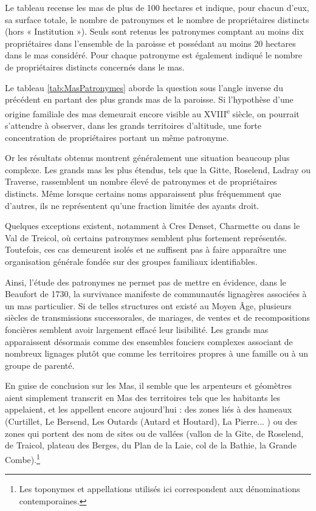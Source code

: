 \documentclass[12pt,a4paper]{report}
\begin{document}
Le tableau recense les mas de plus de 100 hectares et indique, pour chacun d'eux, sa surface totale, le nombre de patronymes et le nombre de propriétaires distincts (hors « Institution »). Seuls sont retenus les patronymes comptant au moins dix propriétaires dans l'ensemble de la paroisse et possédant au moins 20 hectares dans le mas considéré. Pour chaque patronyme est également indiqué le nombre de propriétaires distincts concernés dans le mas.

Le tableau \ref{tab:MasPatronymes} aborde la question sous l'angle inverse du précédent en partant des plus grands mas de la paroisse. Si l'hypothèse d'une origine familiale des mas demeurait encore visible au XVIII\textsuperscript{e} siècle, on pourrait s'attendre à observer, dans les grands territoires d'altitude, une forte concentration de propriétaires portant un même patronyme.

Or les résultats obtenus montrent généralement une situation beaucoup plus complexe. Les grands mas les plus étendus, tels que la Gitte, Roselend, Ladray ou Traverse, rassemblent un nombre élevé de patronymes et de propriétaires distincts. Même lorsque certains noms apparaissent plus fréquemment que d'autres, ils ne représentent qu'une fraction limitée des ayants droit.

Quelques exceptions existent, notamment à Cres Denset, Charmette ou dans le Val de Treicol, où certains patronymes semblent plus fortement représentés. Toutefois, ces cas demeurent isolés et ne suffisent pas à faire apparaître une organisation générale fondée sur des groupes familiaux identifiables.

Ainsi, l'étude des patronymes ne permet pas de mettre en évidence, dans le Beaufort de 1730, la survivance manifeste de communautés lignagères associées à un mas particulier. Si de telles structures ont existé au Moyen Âge, plusieurs siècles de transmissions successorales, de mariages, de ventes et de recompositions foncières semblent avoir largement effacé leur lisibilité. Les grands mas apparaissent désormais comme des ensembles fonciers complexes associant de nombreux lignages plutôt que comme les territoires propres à une famille ou à un groupe de parenté.

En guise de conclusion sur les Mas, il semble que les arpenteurs et géomètres aient simplement transcrit en Mas des territoires tels que les habitants les appelaient, et les appellent encore aujourd'hui : des zones liés à des hameaux (Curtillet, Le Bersend, Les Outards (Autard et Houtard), La Pierre... ) ou des zones qui portent des nom de sites ou de vallées (vallon de la Gite, de Roselend, de Traicol, plateau des Berges, du Plan de la Laie, col de la Bathie, la Grande Combe).\footnote{Les toponymes et appellations utilisés ici correspondent aux dénominations contemporaines.}
\end{document}
